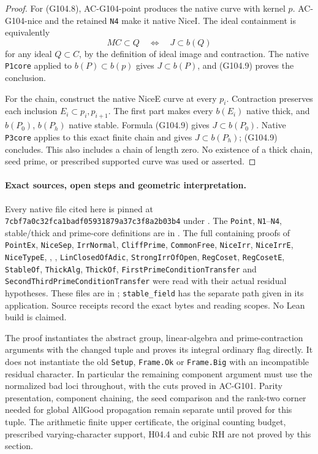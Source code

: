 \begin{proof}
For (G104.8), AC-G104-point produces the native curve with
kernel \(p\).  AC-G104-nice and the retained \texttt{N4}
make it native NiceI.  The ideal containment is equivalently
\[
                 MC\subset Q\quad\Longleftrightarrow\quad J\subset b(Q)
\tag{G104.9}
\]
for any ideal \(Q\subset C\), by the definition of ideal image
and contraction.  The native \texttt{P1core} applied to
\(b(P)\subset b(p)\) gives \(J\subset b(P)\), and (G104.9)
proves the conclusion.

For the chain, construct the native NiceE curve at every
\(p_i\).  Contraction preserves each inclusion
\(E_i\subset p_i,p_{i+1}\).  The first part makes every
\(b(E_i)\) native thick, and \(b(P_0)\), \(b(P_h)\) native
stable.  Formula (G104.9) gives \(J\subset b(P_0)\).
Native \texttt{P3core} applies to this exact finite chain and
gives \(J\subset b(P_h)\); (G104.9) concludes.
This also includes a chain of length zero.  No existence of a
thick chain, seed prime, or prescribed supported curve was used
or asserted.
\end{proof}

\paragraph{Exact sources, open steps and geometric interpretation.}
Every native file cited here is pinned at
\texttt{7cbf7a0c32fca1badf05931879a37c3f8a2b03b4} under
.
The \texttt{Point}, \texttt{N1}--\texttt{N4}, stable/thick and
prime-core definitions are in
.
The full containing proofs of \texttt{PointEx}, \texttt{NiceSep},
\texttt{IrrNormal}, \texttt{CliffPrime}, \texttt{CommonFree},
\texttt{NiceIrr}, \texttt{NiceIrrE}, \texttt{NiceTypeE},
,
,
\texttt{LinClosedOfAdic}, \texttt{StrongIrrOfOpen},
\texttt{RegCoset}, \texttt{RegCosetE}, \texttt{StableOf},
\texttt{ThickAlg}, \texttt{ThickOf},
\texttt{FirstPrimeConditionTransfer} and
\texttt{SecondThirdPrimeConditionTransfer} were read with their
actual residual hypotheses.  These files are in
; \texttt{stable\_field} has the
separate path given in its application.  Source receipts record
the exact bytes and reading scopes.  No Lean build is claimed.

The proof instantiates the abstract group, linear-algebra and
prime-contraction arguments with the changed tuple and proves
its integral ordinary flag directly.  It does not instantiate
the old \texttt{Setup}, \texttt{Frame.Ok} or \texttt{Frame.Big}
with an incompatible residual character.  In particular the
remaining component argument must use the normalized bad loci
throughout, with the cuts proved in AC-G101.  Parity presentation,
component chaining, the seed comparison and the rank-two corner
needed for global AllGood propagation remain separate until
proved for this tuple.  The arithmetic finite upper certificate,
the original counting budget, prescribed varying-character
support, H04.4 and cubic RH are not proved by this section.

